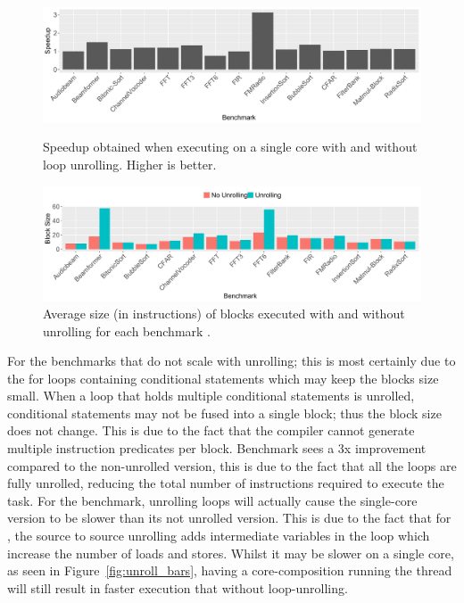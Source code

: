 \begin{figure}[t]
  \includegraphics[width=1\textwidth]{streamit-paper/graphics/unroll_speed_bars.pdf}
   \vspace{-2em}
 \caption{Speedup obtained when executing on a single core with and without loop unrolling. Higher is better.}\label{fig:unroll_bars}
\vspace{-0.5em}
  \includegraphics[width=1\textwidth]{streamit-paper/graphics/unrolling_size.pdf}  \vspace{-2em}

  \caption{Average size (in instructions) of blocks executed with and without unrolling for each benchmark .}\label{fig:unroll_size}  \vspace{-1em}

\end{figure}
For the benchmarks that do not scale with unrolling; this is most certainly due to the for loops containing conditional statements which may keep the blocks size small.
When a loop that holds multiple conditional statements is unrolled, conditional statements may not be fused into a single block; thus the block size does not change.
This is due to the fact that the compiler cannot generate multiple instruction predicates per block.
Benchmark  sees a 3x improvement compared to the non-unrolled version, this is due to the fact that all the loops are fully unrolled, reducing the total number of instructions required to execute the task.
For the  benchmark, unrolling loops will actually cause the single-core version to be slower than its not unrolled version.
This is due to the fact that for , the source to source unrolling adds intermediate variables in the loop which increase the number of loads and stores.
Whilst it may be slower on a single core, as seen in Figure~\ref{fig:unroll_bars}, having a core-composition running the thread will still result in faster execution that without loop-unrolling.

